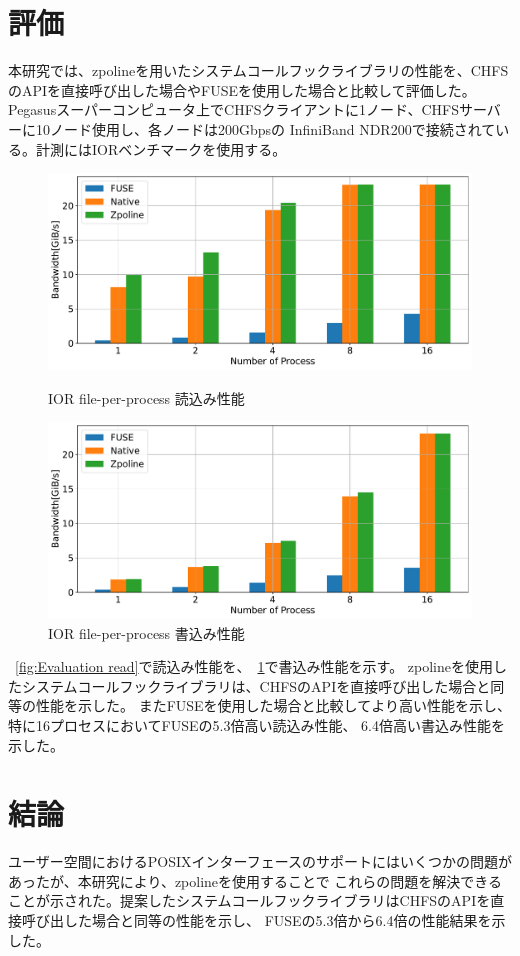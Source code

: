 \documentclass[a4paper,10pt]{jarticle}
\begin{document}
\section{評価}
本研究では、zpolineを用いたシステムコールフックライブラリの性能を、CHFSのAPIを直接呼び出した場合やFUSEを使用した場合と比較して評価した。
Pegasusスーパーコンピュータ上でCHFSクライアントに1ノード、CHFSサーバーに10ノード使用し、各ノードは200Gbpsの
InfiniBand NDR200で接続されている。計測にはIORベンチマークを使用する。

  \begin{figure}[h]
	\centering
	\begin{minipage}[b]{0.49\columnwidth}
		\centering
		\includegraphics[width=0.9\linewidth]{./ior_benchmark_read.pdf}
		\caption{IOR file-per-process 読込み性能}
		\label{fig:Evaluation read}
	\end{minipage}
	\begin{minipage}[b]{0.49\columnwidth}
		\centering
		\includegraphics[width=0.9\linewidth]{./ior_benchmark_write.pdf}
		\caption{IOR file-per-process 書込み性能}
		\label{fig:Evaluation write}
	\end{minipage}
	\end{figure}

\figurename~\ref{fig:Evaluation read}で読込み性能を、\figurename~\ref{fig:Evaluation write}で書込み性能を示す。
zpolineを使用したシステムコールフックライブラリは、CHFSのAPIを直接呼び出した場合と同等の性能を示した。
またFUSEを使用した場合と比較してより高い性能を示し、特に16プロセスにおいてFUSEの5.3倍高い読込み性能、
6.4倍高い書込み性能を示した。

\section{結論}
ユーザー空間におけるPOSIXインターフェースのサポートにはいくつかの問題があったが、本研究により、zpolineを使用することで
これらの問題を解決できることが示された。提案したシステムコールフックライブラリはCHFSのAPIを直接呼び出した場合と同等の性能を示し、
FUSEの5.3倍から6.4倍の性能結果を示した。



\end{document}
